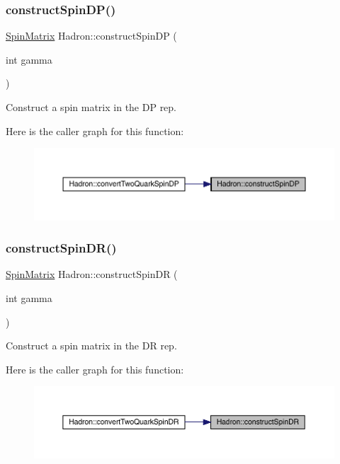 \subsubsection{\texorpdfstring{constructSpinDP()}{constructSpinDP()}}
{\footnotesize\ttfamily \mbox{\hyperlink{group__defs_gad066768e154e358a7f3c0708c774be29}{Spin\+Matrix}} Hadron\+::construct\+Spin\+DP (\begin{DoxyParamCaption}\item[{int}]{gamma }\end{DoxyParamCaption})}



Construct a spin matrix in the DP rep. 

Here is the caller graph for this function\+:
\nopagebreak
\begin{figure}[H]
\begin{center}
\leavevmode
\includegraphics[width=350pt]{d1/daf/namespaceHadron_af2328410f9a0a7191a4d319284425fed_icgraph}
\end{center}
\end{figure}
\mbox{\label{namespaceHadron_add425eaa856f87203aaf3bd1e3eb086d}} 
\subsubsection{\texorpdfstring{constructSpinDR()}{constructSpinDR()}}
{\footnotesize\ttfamily \mbox{\hyperlink{group__defs_gad066768e154e358a7f3c0708c774be29}{Spin\+Matrix}} Hadron\+::construct\+Spin\+DR (\begin{DoxyParamCaption}\item[{int}]{gamma }\end{DoxyParamCaption})}



Construct a spin matrix in the DR rep. 

Here is the caller graph for this function\+:
\nopagebreak
\begin{figure}[H]
\begin{center}
\leavevmode
\includegraphics[width=350pt]{d1/daf/namespaceHadron_add425eaa856f87203aaf3bd1e3eb086d_icgraph}
\end{center}
\end{figure}
\mbox{\label{namespaceHadron_ac6bc3e869d76d287be23c6d20cb9c104}} 
